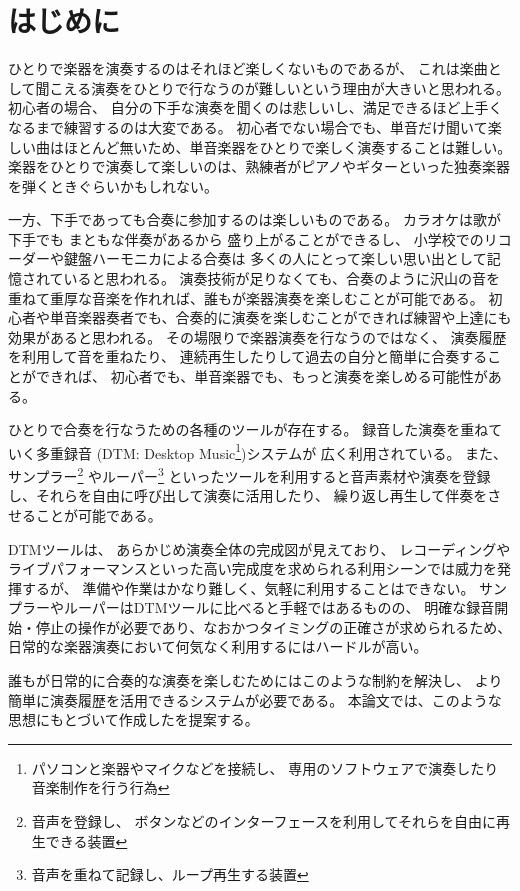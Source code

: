 %
%
\section{はじめに}
\label{sec:start}

ひとりで楽器を演奏するのはそれほど楽しくないものであるが、
これは楽曲として聞こえる演奏をひとりで行なうのが難しいという理由が大きいと思われる。
%
初心者の場合、 自分の下手な演奏を聞くのは悲しいし、満足できるほど上手くなるまで練習するのは大変である。
初心者でない場合でも、単音だけ聞いて楽しい曲はほとんど無いため、単音楽器をひとりで楽しく演奏することは難しい。
楽器をひとりで演奏して楽しいのは、熟練者がピアノやギターといった独奏楽器を弾くときぐらいかもしれない。

一方、下手であっても合奏に参加するのは楽しいものである。
カラオケは歌が下手でも
まともな伴奏があるから
盛り上がることができるし、
小学校でのリコーダーや鍵盤ハーモニカによる合奏は
多くの人にとって楽しい思い出として記憶されていると思われる。
演奏技術が足りなくても、合奏のように沢山の音を重ねて重厚な音楽を作れれば、誰もが楽器演奏を楽しむことが可能である。
初心者や単音楽器奏者でも、合奏的に演奏を楽しむことができれば練習や上達にも効果があると思われる。
%
その場限りで楽器演奏を行なうのではなく、
演奏履歴を利用して音を重ねたり、
連続再生したりして過去の自分と簡単に合奏することができれば、
初心者でも、単音楽器でも、もっと演奏を楽しめる可能性がある。

ひとりで合奏を行なうための各種のツールが存在する。
%
録音した演奏を重ねていく多重録音
(DTM: Desktop Music\footnote{パソコンと楽器やマイクなどを接続し、
    専用のソフトウェアで演奏したり音楽制作を行う行為})システムが
広く利用されている\cite{jacob}\cite{resound}。
%
%
また、サンプラー\footnote{音声を登録し、
    ボタンなどのインターフェースを利用してそれらを自由に再生できる装置}
やルーパー\footnote{音声を重ねて記録し、ループ再生する装置}
といったツールを利用すると音声素材や演奏を登録し、それらを自由に呼び出して演奏に活用したり、
繰り返し再生して伴奏をさせることが可能である。

DTMツールは、
あらかじめ演奏全体の完成図が見えており、
レコーディングやライブパフォーマンスといった高い完成度を求められる利用シーンでは威力を発揮するが、
準備や作業はかなり難しく、気軽に利用することはできない。
%
サンプラーやルーパーはDTMツールに比べると手軽ではあるものの、
明確な録音開始・停止の操作が必要であり、なおかつタイミングの正確さが求められるため、
日常的な楽器演奏において何気なく利用するにはハードルが高い。

誰もが日常的に合奏的な演奏を楽しむためにはこのような制約を解決し、
より簡単に演奏履歴を活用できるシステムが必要である。
本論文では、このような思想にもとづいて作成した{\system}を提案する。
